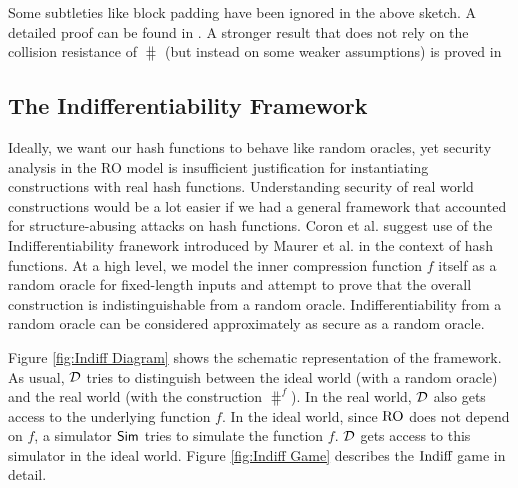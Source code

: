 \noindent Some subtleties like block padding have been ignored in the above sketch. A detailed proof can be found in \cite{Bellare1996}. A stronger result that does not rely on the collision resistance of $\hash$ (but instead on some weaker assumptions) is proved in \cite{Bellare2006}

\subsection{The Indifferentiability Framework}
Ideally, we want our hash functions to behave like random oracles, yet security analysis in the RO model is insufficient justification for instantiating constructions with real hash functions. Understanding security of real world constructions would be a lot easier if we had a general framework that accounted for structure-abusing attacks on hash functions. Coron et al. \cite{Coron2005} suggest use of the Indifferentiability franework introduced by Maurer et al. \cite{Maurer2004} in the context of hash functions. At a high level, we model the inner compression function $f$ itself as a random oracle for fixed-length inputs and attempt to prove that the overall construction is indistinguishable from a random oracle. Indifferentiability from a random oracle can be considered approximately as secure as a random oracle. 

Figure \ref{fig:Indiff Diagram} shows the schematic representation of the framework. As usual, ${\mathcal D}$ tries to distinguish between the ideal world (with a random oracle) and the real world (with the construction $\hash^f$). In the real world, ${\mathcal D}$ also gets access to the underlying function $f$. In the ideal world, since $\textnormal{RO}$ does not depend on $f$, a simulator $\textsf{Sim}$ tries to simulate the function $f$. ${\mathcal D}$ gets access to this simulator in the ideal world. Figure \ref{fig:Indiff Game} describes the $\textnormal{Indiff}$ game in detail.


